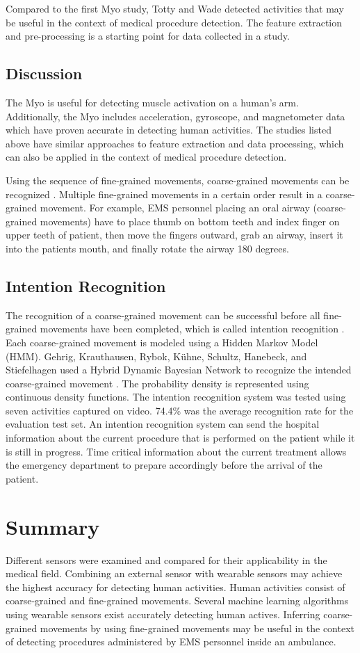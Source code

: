 \par Compared to the first Myo study, Totty and Wade detected activities that may be useful in the context of medical procedure detection. The feature extraction and pre-processing is a starting point for data collected in a study.
\subsection{Discussion}
The Myo is useful for detecting muscle activation on a human's arm. Additionally, the Myo includes acceleration, gyroscope, and magnetometer data which have proven accurate in detecting human activities. The studies listed above have similar approaches to feature extraction and data processing, which can also be applied in the context of medical procedure detection.
\par Using the sequence of fine-grained movements, coarse-grained movements can be recognized \cite{Dirk2010}. Multiple fine-grained movements in a certain order result in a coarse-grained movement. For example, EMS personnel placing an oral airway (coarse-grained movements) have to place thumb on bottom teeth and index finger on upper teeth of patient, then move the fingers outward, grab an airway, insert it into the patients mouth, and finally rotate the airway 180 degrees.
\subsection{Intention Recognition}
The recognition of a coarse-grained movement can be successful before all fine-grained movements have been completed, which is called intention recognition \cite{Schrempf2005}. Each coarse-grained movement is modeled using a Hidden Markov Model (HMM). Gehrig, Krauthausen, Rybok, K{\"{u}}hne, Schultz, Hanebeck, and Stiefelhagen used a Hybrid Dynamic Bayesian Network to recognize the intended coarse-grained movement \cite{Gehrig2011}. The probability density is represented using continuous density functions. The intention recognition system was tested using seven activities captured on video. 74.4\% was the average recognition rate for the evaluation test set. An intention recognition system can send the hospital information about the current procedure that is performed on the patient while it is still in progress. Time critical information about the current treatment allows the emergency department to prepare accordingly before the arrival of the patient.
\section{Summary}
\label{sec:Literature-Review:Summary}
Different sensors were examined and compared for their applicability in the medical field. Combining an external sensor with wearable sensors may achieve the highest accuracy for detecting human activities. Human activities consist of coarse-grained and fine-grained movements. Several machine learning algorithms using wearable sensors exist accurately detecting human actives. Inferring coarse-grained movements by using fine-grained movements may be useful in the context of detecting procedures administered by EMS personnel inside an ambulance. 